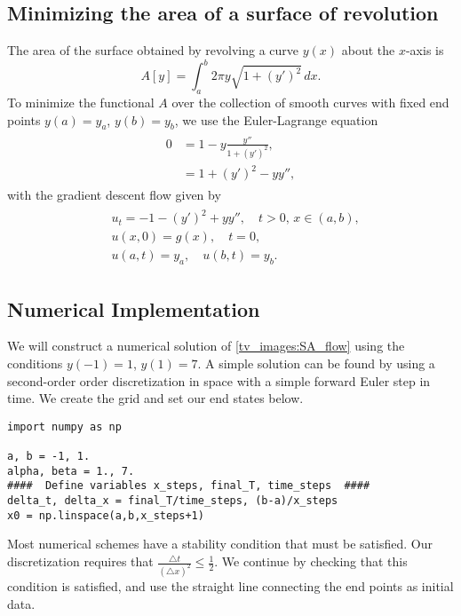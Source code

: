 \subsection*{Minimizing the area of a surface of revolution}
The area of the surface obtained by revolving a curve $y(x)$ about the $x$-axis is
\[A[y] = \int_a^b 2 \pi y \sqrt{1 + (y')^2} \, dx.
\]
To minimize the functional $A$ over the collection of smooth curves with fixed end points $y(a) = y_a$, $y(b) = y_b$, we use the Euler-Lagrange equation
\begin{align}
    \begin{split}
    0 &= 1 - y \frac{y''}{1 + (y')^2} , \\
    &= 1 + (y')^2 - y y'',
    \end{split}\label{tv_images:SA_EL_equation}
\end{align}
with the gradient descent flow given by
\begin{align}
    \begin{split}
    &{ } u_t = -1 - (y')^2 + y y'',\quad t > 0,\, x \in (a,b), \\
    &{ } u(x,0) = g(x), \quad t = 0,\\
    &{ } u(a,t) = y_a, \quad u(b,t) = y_b.
    \end{split}\label{tv_images:SA_flow}
\end{align}

\subsection*{Numerical Implementation}
We will construct a numerical solution of \eqref{tv_images:SA_flow} using the conditions $y(-1) = 1$, $y(1) = 7$.
A simple solution can be found by using a second-order order discretization in space  with a simple forward Euler step in time. We create the grid and set our end states below.
\begin{lstlisting}
import numpy as np

a, b = -1, 1.
alpha, beta = 1., 7.
####  Define variables x_steps, final_T, time_steps  ####
delta_t, delta_x = final_T/time_steps, (b-a)/x_steps
x0 = np.linspace(a,b,x_steps+1)
\end{lstlisting}

Most numerical schemes have a stability condition that must be satisfied. Our discretization requires that $\frac{\triangle t}{(\triangle x)^2} \leq \frac{1}{2}$.
We continue by checking that this condition is satisfied, and use the straight line connecting the end points as initial data.

